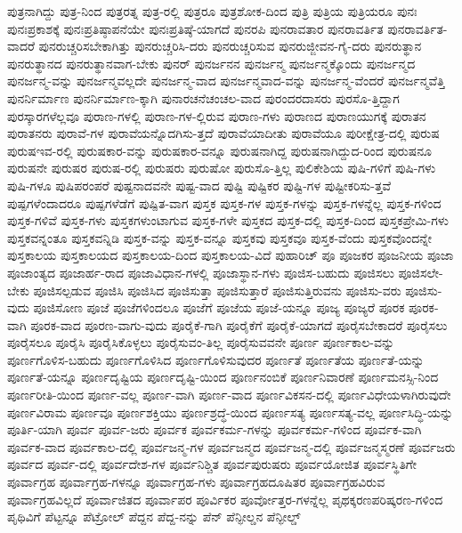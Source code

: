 {ಪುತ್ರನಾಗಿದ್ದು
ಪುತ್ರ-ನಿಂದ
ಪುತ್ರರತ್ನ
ಪುತ್ರ-ರಲ್ಲಿ
ಪುತ್ರರೂ
ಪುತ್ರಶೋಕ-ದಿಂದ
ಪುತ್ರಿ
ಪುತ್ರಿಯ
ಪುತ್ರಿಯರೂ
ಪುನಃ
ಪುನಃಪ್ರಕಾಶಕ್ಕೆ
ಪುನಃಪ್ರತಿಷ್ಠಾಪನೆಯೇ
ಪುನಃಪ್ರತಿಷ್ಠೆ-ಯಾಗದೆ
ಪುನರಪಿ
ಪುನರಾವತಾರ
ಪುನರಾವರ್ತಿತ
ಪುನರಾವರ್ತಿತ-ವಾದರೆ
ಪುನರುಚ್ಚರಿಸಬೇಕಾಗಿತ್ತು
ಪುನರುಚ್ಚರಿಸಿ-ದರು
ಪುನರುಚ್ಚರಿಸುವ
ಪುನರುಜ್ಜೀವನ-ಗೈ-ದರು
ಪುನರುತ್ಥಾನ
ಪುನರುತ್ಥಾನದ
ಪುನರುತ್ಥಾನವಾಗ-ಬೇಕು
ಪುನರ್
ಪುನರ್ಜನನ
ಪುನರ್ಜನ್ಮ
ಪುನರ್ಜನ್ಮಕ್ಕೊಂದು
ಪುನರ್ಜನ್ಮದ
ಪುನರ್ಜನ್ಮ-ವನ್ನು
ಪುನರ್ಜನ್ಮವಲ್ಲದೇ
ಪುನರ್ಜನ್ಮ-ವಾದ
ಪುನರ್ಜನ್ಮವಾದ-ವನ್ನು
ಪುನರ್ಜನ್ಮ-ವೆಂದರೆ
ಪುನರ್ಜನ್ಮವೆತ್ತಿ
ಪುನರ್ನಿರ್ಮಾಣ
ಪುನರ್ನಿರ್ಮಾಣ-ಕ್ಕಾಗಿ
ಪುನಾರಚನೆಚಂಚಲ-ವಾದ
ಪುರಂದರದಾಸರು
ಪುರಸೊ-ತ್ತಿದ್ದಾಗ
ಪುರಸ್ಕಾರಗಳೆಲ್ಲವೂ
ಪುರಾಣ-ಗಳಲ್ಲಿ
ಪುರಾಣ-ಗಳ-ಲ್ಲಿರುವ
ಪುರಾಣ-ಗಳು
ಪುರಾಣದ
ಪುರಾಣಯುಗಕ್ಕೆ
ಪುರಾತನ
ಪುರಾತನರು
ಪುರಾವೆ-ಗಳ
ಪುರಾವೆಯನ್ನೊದಗಿಸು-ತ್ತದೆ
ಪುರಾವೆಯಾದೀತು
ಪುರಾವೆಯೂ
ಪುರೀಕ್ಷೇತ್ರ-ದಲ್ಲಿ
ಪುರುಷ
ಪುರುಷಇವ-ರಲ್ಲಿ
ಪುರುಷಕಾರ-ವನ್ನು
ಪುರುಷಕಾರ-ವನ್ನೂ
ಪುರುಷನಾಗಿದ್ದ
ಪುರುಷನಾಗಿದ್ದುದ-ರಿಂದ
ಪುರುಷನೂ
ಪುರುಷನೇ
ಪುರುಷರ
ಪುರುಷ-ರಲ್ಲಿ
ಪುರುಷರು
ಪುರುಷೋ
ಪುರುಸೊ-ತ್ತಿಲ್ಲ
ಪುಲಿಕೇಶಿಯ
ಪುಷಿ-ಗಳಿಗೆ
ಪುಷಿ-ಗಳು
ಪುಷಿ-ಗಳೂ
ಪುಷಿಪರಂಪರೆ
ಪುಷ್ಟನಾದವನೇ
ಪುಷ್ಟ-ವಾದ
ಪುಷ್ಟಿ
ಪುಷ್ಟಿಕರ
ಪುಷ್ಟಿ-ಗಳ
ಪುಷ್ಟೀಕರಿಸು-ತ್ತವೆ
ಪುಷ್ಪಗಳೆಂದಾದರೂ
ಪುಷ್ಪಗಳೆಡೆಗೆ
ಪುಷ್ಪಿತ-ವಾಗ
ಪುಸ್ತಕ
ಪುಸ್ತಕ-ಗಳ
ಪುಸ್ತಕ-ಗಳನ್ನು
ಪುಸ್ತಕ-ಗಳನ್ನೆಲ್ಲ
ಪುಸ್ತಕ-ಗಳಿಂದ
ಪುಸ್ತಕ-ಗಳಿವೆ
ಪುಸ್ತಕ-ಗಳು
ಪುಸ್ತಕಗಳುಂಟಾಗುವ
ಪುಸ್ತಕ-ಗಳೇ
ಪುಸ್ತಕದ
ಪುಸ್ತಕ-ದಲ್ಲಿ
ಪುಸ್ತಕ-ದಿಂದ
ಪುಸ್ತಕಪ್ರೇಮಿ-ಗಳು
ಪುಸ್ತಕವನ್ನಂತೂ
ಪುಸ್ತಕವನ್ನಿಡಿ
ಪುಸ್ತಕ-ವನ್ನು
ಪುಸ್ತಕ-ವನ್ನೂ
ಪುಸ್ತಕವು
ಪುಸ್ತಕವೂ
ಪುಸ್ತಕ-ವೆಂದು
ಪುಸ್ತಕವೊಂದನ್ನೇ
ಪುಸ್ತಕಾಲಯ
ಪುಸ್ತಕಾಲಯದ
ಪುಸ್ತಕಾಲಯ-ದಿಂದ
ಪುಸ್ತಕಾಲಯ-ವಿದೆ
ಪುಹಾರಿಚ್
ಪೂ
ಪೂಜಕರ
ಪೂಜನೀಯ
ಪೂಜಾ
ಪೂಜಾಂತ್ಯದ
ಪೂಜಾರ್ಹ-ರಾದ
ಪೂಜಾವಿಧಾನ-ಗಳಲ್ಲಿ
ಪೂಜಾಸ್ಥಾನ-ಗಳು
ಪೂಜಿಸ-ಬಹುದು
ಪೂಜಿಸಲು
ಪೂಜಿಸಲೇ-ಬೇಕು
ಪೂಜಿಸಲ್ಪಡುವ
ಪೂಜಿಸಿ
ಪೂಜಿಸಿದ
ಪೂಜಿಸುತ್ತಾ
ಪೂಜಿಸುತ್ತಾರೆ
ಪೂಜಿಸುತ್ತಿರುವನು
ಪೂಜಿಸು-ವರು
ಪೂಜಿಸು-ವುದು
ಪೂಜಿಸೋಣ
ಪೂಜೆ
ಪೂಜೆಗಳಿಂದಲೂ
ಪೂಜೆಗೆ
ಪೂಜೆಯ
ಪೂಜೆ-ಯನ್ನೂ
ಪೂಜ್ಯ
ಪೂಜ್ಯರೆ
ಪೂರಕ
ಪೂರಕ-ವಾಗಿ
ಪೂರಕ-ವಾದ
ಪೂರಣ-ವಾಗು-ವುದು
ಪೂರೈಕೆ-ಗಾಗಿ
ಪೂರೈಕೆಗೆ
ಪೂರೈಕೆ-ಯಾಗದೆ
ಪೂರೈಸಬೇಕಾದರೆ
ಪೂರೈಸಲು
ಪೂರೈಸಲೂ
ಪೂರೈಸಿ
ಪೂರೈಸಿಕೊಳ್ಳಲು
ಪೂರೈಸುವಂ-ತಿಲ್ಲ
ಪೂರೈಸುವವನೇ
ಪೂರ್ಣ
ಪೂರ್ಣಕಾಲ-ವನ್ನು
ಪೂರ್ಣಗೊಳಿಸ-ಬಹುದು
ಪೂರ್ಣಗೊಳಿಸಿದ
ಪೂರ್ಣಗೊಳಿಸುವುದರ
ಪೂರ್ಣತೆ
ಪೂರ್ಣತೆಯ
ಪೂರ್ಣತೆ-ಯನ್ನು
ಪೂರ್ಣತೆ-ಯನ್ನೂ
ಪೂರ್ಣದೃಷ್ಟಿಯ
ಪೂರ್ಣದೃಷ್ಟಿ-ಯಿಂದ
ಪೂರ್ಣನಂಬಿಕೆ
ಪೂರ್ಣನಿವಾರಣೆ
ಪೂರ್ಣಮನಸ್ಸಿ-ನಿಂದ
ಪೂರ್ಣರೀತಿ-ಯಿಂದ
ಪೂರ್ಣ-ವಲ್ಲ
ಪೂರ್ಣ-ವಾಗಿ
ಪೂರ್ಣ-ವಾದ
ಪೂರ್ಣವಿಕಸನ-ದಲ್ಲಿ
ಪೂರ್ಣವಿಧೇಯಳಾಗಿರುವುದೇ
ಪೂರ್ಣವಿರಾಮ
ಪೂರ್ಣವೂ
ಪೂರ್ಣಶಕ್ತಿಯು
ಪೂರ್ಣಶ್ರದ್ಧೆ-ಯಿಂದ
ಪೂರ್ಣಸತ್ಯ
ಪೂರ್ಣಸತ್ಯ-ವಲ್ಲ
ಪೂರ್ಣಸಿದ್ಧಿ-ಯನ್ನು
ಪೂರ್ತಿ-ಯಾಗಿ
ಪೂರ್ವ
ಪೂರ್ವ-ಜರು
ಪೂರ್ವಕ
ಪೂರ್ವಕರ್ಮ-ಗಳನ್ನು
ಪೂರ್ವಕರ್ಮ-ಗಳಿಂದ
ಪೂರ್ವಕ-ವಾಗಿ
ಪೂರ್ವಕ-ವಾದ
ಪೂರ್ವಕಾಲ-ದಲ್ಲಿ
ಪೂರ್ವಜನ್ಮ-ಗಳ
ಪೂರ್ವಜನ್ಮದ
ಪೂರ್ವಜನ್ಮ-ದಲ್ಲಿ
ಪೂರ್ವಜನ್ಮಸ್ಮರಣೆ
ಪೂರ್ವಜರು
ಪೂರ್ವದ
ಪೂರ್ವ-ದಲ್ಲಿ
ಪೂರ್ವದೇಶ-ಗಳ
ಪೂರ್ವನಿಶ್ಚಿತ
ಪೂರ್ವಪುರುಷರು
ಪೂರ್ವಯೋಜಿತ
ಪೂರ್ವಸ್ಥಿತಿಗೇ
ಪೂರ್ವಾಗ್ರಹ
ಪೂರ್ವಾಗ್ರಹ-ಗಳನ್ನೂ
ಪೂರ್ವಾಗ್ರಹ-ಗಳು
ಪೂರ್ವಾಗ್ರಹದೂಷಿತರ
ಪೂರ್ವಾಗ್ರಹವಿರುವ
ಪೂರ್ವಾಗ್ರಹವಿಲ್ಲದೆ
ಪೂರ್ವಾಜಿತದ
ಪೂರ್ವಾಪರ
ಪೂರ್ವಿಕರ
ಪೂರ್ವೋತ್ತರ-ಗಳನ್ನೆಲ್ಲ
ಪೃಥಕ್ಕರಣಪರಿಷ್ಕರಣ-ಗಳಿಂದ
ಪೃಥಿವಿಗೆ
ಪೆಟ್ಟನ್ನೂ
ಪೆಟ್ರೋಲ್
ಪೆದ್ದನ
ಪೆದ್ದ-ನನ್ನು
ಪೆನ್
ಪೆನ್ಫೀಲ್ಡನ
ಪೆನ್ಫೀಲ್ಡ್
}
